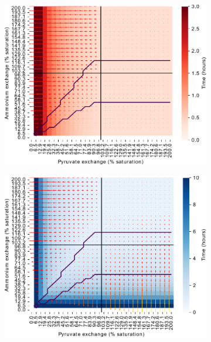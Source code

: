 \begin{figure}
  \begin{subfigure}[t]{0.45\textwidth}
  \centering
    \includegraphics[width=\linewidth]{ec_grid_pyr_amm_carb}
    \caption{
    }
    \label{fig:model-grid-pyr-carb}
  \end{subfigure}%
  \begin{subfigure}[t]{0.45\textwidth}
  \centering
    \includegraphics[width=\linewidth]{ec_grid_pyr_amm_prot}
    \caption{
    }
    \label{fig:model-grid-pyr-prot}
  \end{subfigure}


\end{figure}
